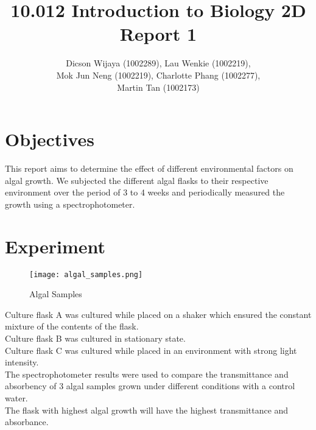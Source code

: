 \documentclass[12pt,a4paper]{article}
\author{Dicson Wijaya (1002289), Lau Wenkie (1002219), \\ Mok Jun Neng (1002219), Charlotte Phang (1002277), \\ Martin Tan (1002173)}
\title{10.012 Introduction to Biology 2D Report 1}
\begin{document}
	
	\maketitle
	
	\section{Objectives}
	This report aims to determine the effect of different environmental factors on algal growth. We subjected the different algal flasks to their respective environment over the period of 3 to 4 weeks and periodically measured the growth using a spectrophotometer.
	
	\section{Experiment}
	\begin{figure}[H]
		\begin{center}
			\texttt{[image: algal\_samples.png]}
			\caption{Algal Samples}
			\label{fig:algalsamples}
		\end{center}
	\end{figure}
    Culture flask A was cultured while placed on a shaker which ensured the constant mixture of the contents of the flask. \\
    
    Culture flask B was cultured in stationary state. \\
    
    Culture flask C was cultured while placed in an environment with strong light intensity. \\
    
    The spectrophotometer results were used to compare the transmittance and absorbency of 3 algal samples grown under different conditions with a control water. \\
    
    The flask with highest algal growth will have the highest transmittance and absorbance.
    
\end{document}
